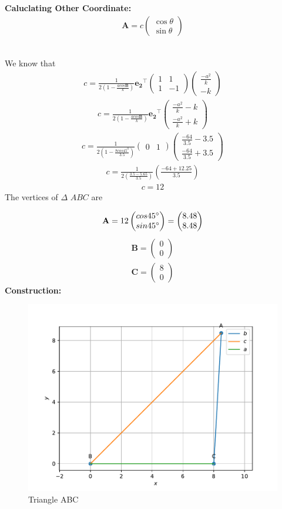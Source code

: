 \documentclass{article}
\newcommand{\myvec}[1]{\ensuremath{\begin{pmatrix}#1\end{pmatrix}}}
\let\vec\mathbf
\begin{document}
\raggedright\textbf{Caluclating Other Coordinate: } 
  \begin{align}
	  \vec{A} = c\myvec{\cos \theta\\\sin\theta}
	  \end{align}\\
\raggedright We know that
\begin{align}  
      c    
        =
	\frac{1}{2(1-\frac{acos\vec{B}}{k})}
	 \vec{e_2}^{\top}
	\myvec{1 & 1\\1 & -1}
	\myvec{\frac{-a^2}{k}\\-k}
     \end{align}
  \begin{align}
        c
	  =
         \frac{1}{2(1-\frac{acos\vec{B}}{k})}
	  \vec{e_2}^{\top}
	  \myvec{\frac{-a^2}{k}-k\\\frac{-a^2}{k}+k}
  \end{align}
\begin{align}
        c
         =
         \frac{1}{2(1-\frac{8cos45^0}{3.5})}
	  \myvec{0 & 1}
	\myvec{\frac{-64}{3.5}-3.5\\\frac{-64}{3.5}+3.5}
  \end{align}	
\begin{align}
       c
	 =
	 \frac{1}{2\left(\frac{3.5-5.65}{3.5}\right)}
	 \left(\frac{-64+12.25}{3.5}\right) 
     \end{align}
     \begin{align}
	 c = 12
      \end{align}
  The vertices of $\Delta$ $ABC$ are \\
\raggedright
\begin{align}
 \vec{A} = 12\myvec{cos 45\degree\\sin 45\degree}
         = \myvec{8.48\\8.48}
\end{align}
\begin{align}
 \vec{B} = \myvec{0\\0}\\
 \vec{C} = \myvec{8\\0}
 \end{align} 	      
\textbf{Construction:}\\
\begin{figure}[h]
 \begin{center}
	 \includegraphics[width=\columnwidth]{figs/triangle.pdf}
 \end{center}
 \caption{Triangle ABC}
 \label{fig:Fig1}
\end{figure}	
\end{document}
